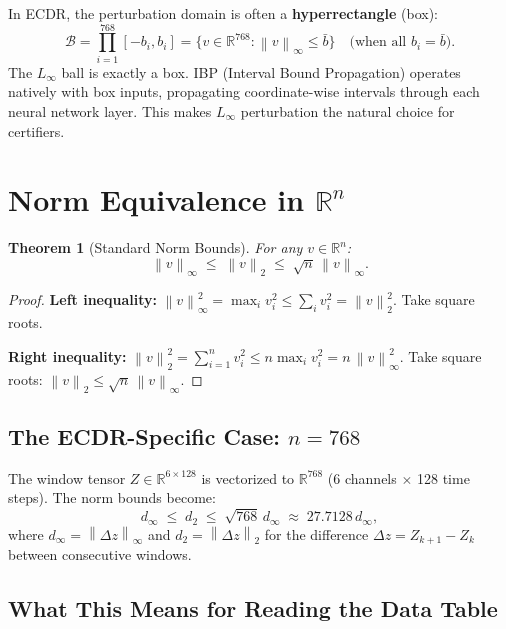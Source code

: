 \documentclass[11pt, a4paper]{article}
\theoremstyle{definition}
\theoremstyle{plain}
\newtheorem{theorem}{Theorem}[section]
\newcommand{\R}{\mathbb{R}}
\newcommand{\norm}[2]{\left\|#1\right\|_{#2}}
\begin{document}
In ECDR, the perturbation domain is often a \textbf{hyperrectangle} (box):
\[
  \mathcal{B} = \prod_{i=1}^{768} [-b_i, b_i]
  = \bigl\{ v \in \R^{768} : \norm{v}{\infty} \le \bar{b} \bigr\}
  \quad \text{(when all $b_i = \bar{b}$).}
\]
The $L_\infty$ ball is exactly a box. IBP (Interval Bound Propagation) operates
natively with box inputs, propagating coordinate-wise intervals through each neural
network layer. This makes $L_\infty$ perturbation the natural choice for certifiers.

\section{Norm Equivalence in $\R^n$}

\begin{theorem}[Standard Norm Bounds]
  For any $v \in \R^n$:
  \begin{equation}\label{eq:norm_bounds}
    \norm{v}{\infty}
    \;\le\; \norm{v}{2}
    \;\le\; \sqrt{n}\,\norm{v}{\infty}.
  \end{equation}
\end{theorem}

\begin{proof}
  \textbf{Left inequality:} $\norm{v}{\infty}^2 = \max_i v_i^2 \le \sum_i v_i^2 = \norm{v}{2}^2$.
  Take square roots.

  \textbf{Right inequality:} $\norm{v}{2}^2 = \sum_{i=1}^n v_i^2 \le n \max_i v_i^2 = n\,\norm{v}{\infty}^2$.
  Take square roots: $\norm{v}{2} \le \sqrt{n}\,\norm{v}{\infty}$.
\end{proof}

\subsection{The ECDR-Specific Case: $n = 768$}

The window tensor $Z \in \R^{6 \times 128}$ is vectorized to $\R^{768}$ (6 channels
$\times$ 128 time steps). The norm bounds become:
\begin{equation}
  d_\infty \;\le\; d_2 \;\le\; \sqrt{768}\,d_\infty \;\approx\; 27.7128\,d_\infty,
\end{equation}
where $d_\infty = \norm{\Delta z}{\infty}$ and $d_2 = \norm{\Delta z}{2}$ for
the difference $\Delta z = Z_{k+1} - Z_k$ between consecutive windows.

\subsection{What This Means for Reading the Data Table}
\end{document}
